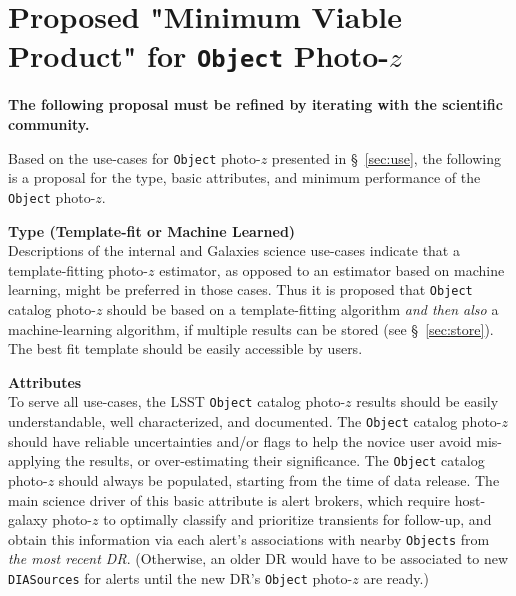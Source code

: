 \documentclass[DM,lsstdraft,toc]{lsstdoc}
\begin{document}
%
%





\section{Proposed "Minimum Viable Product" for {\tt Object} Photo-$z$}\label{sec:mvp}

{\bf The following proposal must be refined by iterating with the scientific community.}

Based on the use-cases for {\tt Object} photo-$z$ presented in \S~\ref{sec:use}, the following is a proposal for the type, basic attributes, and minimum performance of the {\tt Object} photo-$z$.

{\bf Type (Template-fit or Machine Learned)}\\
Descriptions of the internal and Galaxies science use-cases indicate that a template-fitting photo-$z$ estimator, as opposed to an estimator based on machine learning, might be preferred in those cases.
Thus it is proposed that  {\tt Object} catalog photo-$z$ should be based on a template-fitting algorithm {\it and then also} a machine-learning algorithm, if multiple results can be stored (see \S~\ref{sec:store}).
The best fit template should be easily accessible by users. 

{\bf Attributes}\\
To serve all use-cases, the LSST {\tt Object} catalog photo-$z$ results should be easily understandable, well characterized, and documented.
The {\tt Object} catalog photo-$z$ should have reliable uncertainties and/or flags to help the novice user avoid mis-applying the results, or over-estimating their significance.
The {\tt Object} catalog photo-$z$ should always be populated, starting from the time of data release.
The main science driver of this basic attribute is alert brokers, which require host-galaxy photo-$z$ to optimally classify and prioritize transients for follow-up, and obtain this information via each alert's associations with nearby {\tt Objects} from {\it the most recent DR}.
(Otherwise, an older DR would have to be associated to new {\tt DIASources} for alerts until the new DR's {\tt Object} photo-$z$ are ready.)
\end{document}

